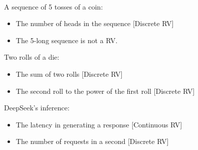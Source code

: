 \documentclass[device=normal, lang=en, fontsize=12pt]{elegantnote}
\numberwithin{equation}{section}
\theoremstyle{definition} %
\begin{document}
\begin{example}[Examples of RV] ~ \\ 
    A sequence of 5 tosses of a coin:
    \begin{itemize}
        \item The number of heads in the sequence [Discrete RV]
        \item The 5-long sequence is not a RV.
    \end{itemize}
    Two rolls of a die:
    \begin{itemize}
        \item The sum of two rolls [Discrete RV]
        \item The second roll to the power of the first roll [Discrete RV]
    \end{itemize}
    DeepSeek's inference:
    \begin{itemize}
        \item The latency in generating a response [Continuous RV]
        \item The number of requests in a second [Discrete RV]
    \end{itemize}
\end{example}
\end{document}
